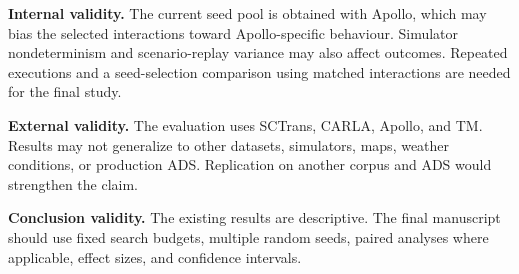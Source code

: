 \textbf{Internal validity.} The current seed pool is obtained with Apollo, which may bias the selected interactions toward Apollo-specific behaviour. Simulator nondeterminism and scenario-replay variance may also affect outcomes. Repeated executions and a seed-selection comparison using matched interactions are needed for the final study.

\textbf{External validity.} The evaluation uses SCTrans, CARLA, Apollo, and TM. Results may not generalize to other datasets, simulators, maps, weather conditions, or production ADS. Replication on another corpus and ADS would strengthen the claim.

\textbf{Conclusion validity.} The existing results are descriptive. The final manuscript should use fixed search budgets, multiple random seeds, paired analyses where applicable, effect sizes, and confidence intervals.
